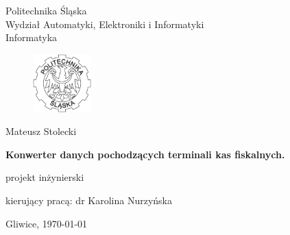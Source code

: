 


\pagestyle{empty}
\sffamily

\noindent
\begin{center}
    \Large
    Politechnika Śląska\\
    Wydział Automatyki, Elektroniki i Informatyki
    \\ Informatyka
\end{center}

\begin{figure}[h]
\begin{center}
\includegraphics[width=0.2\textwidth]{img/polsl.pdf}
\end{center}
\end{figure}

\vfill\vfill
\begin{center}
    \Large
    Mateusz Stolecki
\end{center}

\vfill
\begin{center}
    \Huge\bfseries
    Konwerter danych pochodzących terminali kas fiskalnych.
\end{center}

\vfill
\begin{center}
    \Large
    projekt inżynierski
\end{center}

\vfill\vfill\vfill
\begin{center}
    \Large
    kierujący pracą: dr Karolina Nurzyńska
\end{center}

\vfill
\begin{center}
\large
   Gliwice, \today
\end{center}

\cleardoublepage


\rmfamily
\normalfont

\pagestyle{headings}
\tableofcontents



